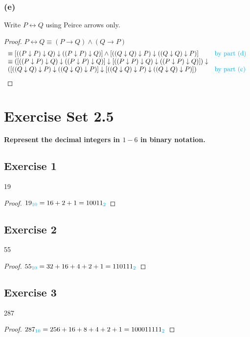\documentclass[14pt]{extarticle}
\newcommand{\bic}{\leftrightarrow}
\newcommand{\base}[1]{{\color{cyan}#1}}
\newcommand{\da}{\downarrow}
\begin{document}
\subsubsection{(e)} 
Write $P \bic Q$ using Peirce arrows only.

\begin{proof} 
$P \bic Q \equiv (P \to Q)\wedge(Q \to P)$ 
$$ 
\begin{array}{ll}
\equiv [((P \da P) \da Q) \da ((P \da P) \da Q)] \wedge [((Q \da Q) \da P) \da ((Q \da Q) \da P)] & \text{\color{cyan}by part (d)} \\ 
\equiv ([((P \da P) \da Q) \da ((P \da P) \da Q)] \da [((P \da P) \da Q) \da ((P \da P) \da Q)]) \da & \\ ([((Q \da Q) \da P) \da ((Q \da Q) \da P)] \da [((Q \da Q) \da P) \da ((Q \da
Q) \da P)]) & \text{\color{cyan}by part (c)} \\ 
\end{array} 
$$ 
\end{proof}

\section{Exercise Set 2.5} 
{\bf \color{cyan} Represent the decimal integers in $1-6$ in binary notation.}

\subsection{Exercise 1} 
19

\begin{proof} 
$19_\base{10} = 16 + 2 + 1 = 10011_\base{2}$ 
\end{proof}

\subsection{Exercise 2} 
55

\begin{proof} 
$55_\base{10} = 32 + 16 + 4 + 2 + 1 = 110111_\base{2}$ 
\end{proof}

\subsection{Exercise 3} 
287

\begin{proof} 
$287_\base{10} = 256 + 16 + 8 + 4 + 2 + 1 = 100011111_\base{2}$
\end{proof}
\end{document}

